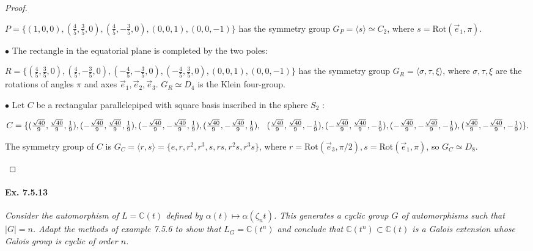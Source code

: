 \documentclass[11pt,a4paper]{article}
\newcommand{\C}{\mathbb{C}}
\begin{document}
\begin{proof}
\begin{enumerate}
$P = \{(1,0,0), (\frac{4}{5},\frac{3}{5},0), (\frac{4}{5},-\frac{3}{5},0),  (0,0,1), (0,0,-1)\}$ has the symmetry group $G_P= \langle s \rangle \simeq C_2$, where $s = \mathrm{Rot}(\vec{e}_1,\pi)$.

$\bullet$ The rectangle in the equatorial plane is completed by the two poles:

$R = \{(\frac{4}{5},\frac{3}{5},0),(\frac{4}{5},-\frac{3}{5},0),(-\frac{4}{5},-\frac{3}{5},0),(-\frac{4}{5},\frac{3}{5},0), (0,0,1), (0,0,-1)\}$ has the symmetry group $G_R =\langle \sigma, \tau,\xi\rangle$, where $\sigma,\tau,\xi$ are the rotations of angles $\pi$ and axes $\vec{e}_1, \vec{e}_2,\vec{e}_3$. $G_R \simeq D_4$ is the Klein four-group. 

$\bullet$ Let $C$ be a rectangular parallelepiped with square basis  inscribed in the sphere $S_2$ :

$
C=\{ (\frac{\sqrt{40}}{9},\frac{\sqrt{40}}{9},\frac{1}{9}),(-\frac{\sqrt{40}}{9},\frac{\sqrt{40}}{9},\frac{1}{9}),(-\frac{\sqrt{40}}{9},-\frac{\sqrt{40}}{9},\frac{1}{9}),(\frac{\sqrt{40}}{9},-\frac{\sqrt{40}}{9},\frac{1}{9}),\\
 \ \ (\frac{\sqrt{40}}{9},\frac{\sqrt{40}}{9},-\frac{1}{9}),(-\frac{\sqrt{40}}{9},\frac{\sqrt{40}}{9},-\frac{1}{9}),(-\frac{\sqrt{40}}{9},-\frac{\sqrt{40}}{9},-\frac{1}{9}),(\frac{\sqrt{40}}{9},-\frac{\sqrt{40}}{9},-\frac{1}{9}) \}. 
$

The symmetry group of $C$ is $G_C =\langle r,s \rangle= \{e,r,r^2,r^3,s,rs,r^2s,r^3s\}$, where $r = \mathrm{Rot}(\vec{e}_3,\pi/2), s = \mathrm{Rot}(\vec{e}_1,\pi)$, so $G_C \simeq D_8$.
\end{enumerate}
\end{proof}

\paragraph{Ex. 7.5.13}

{\it Consider the automorphism of $L = \C(t)$ defined by $\alpha(t) \mapsto \alpha(\zeta_n t)$. This generates a cyclic group $G$ of automorphisms such that $|G| = n$. Adapt the methods of example 7.5.6 to show that $L_G = \C(t^n)$ and conclude that $\C(t^n) \subset \C(t)$ is a Galois extension whose Galois group is cyclic of order $n$.
}
\end{document}
